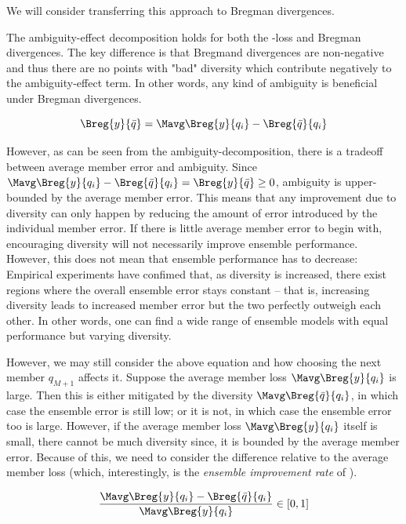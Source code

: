 \documentclass[
    a4paper, %
	fontsize=10pt, %
	twoside=false, %
]{kaobook}
\begin{document}
\begin{titlepage}
We will consider transferring this approach to Bregman divergences.

The ambiguity-effect decomposition holds for both the \zeroone-loss and Bregman divergences. The key difference is that Bregmand divergences are non-negative and thus there are no points with "bad" diversity which contribute negatively to the ambiguity-effect term. In other words, any kind of ambiguity is beneficial under Bregman divergences.

$$
\Breg{y}{\bar{q}} = \Mavg \Breg{y}{q_{i}} - \Breg{\bar{q}}{q_{i}}
$$

However, as can be seen from the ambiguity-decomposition, there is a tradeoff between average member error and ambiguity. Since 
$ \Mavg \Breg{y}{q_{i}} - \Breg{\bar{q}}{q_{i}} = \Breg{y}{\bar{q}} \geq 0$, 
ambiguity is upper-bounded by the average member error. This means that any improvement due to diversity can only happen by reducing the amount of error introduced by the individual member error. If there is little average member error to begin with, encouraging diversity will not necessarily improve ensemble performance. However, this does not mean that ensemble performance has to decrease: Empirical experiments \cite{buschj-etc} have confimed that, as diversity is increased, there exist regions where the overall ensemble error stays constant -- that is, increasing diversity leads to increased member error but the two perfectly outweigh each other. In other words, one can find a wide range of ensemble models with equal performance but varying diversity.


However, we may still consider the above equation and how choosing the next member $q_{M+1}$ affects it. Suppose the average member loss $\Mavg \Breg{y}{q_{i}}$ is large. Then this is either mitigated by the diversity $\Mavg \Breg{\bar{q}}{q_{i}}$, in which case the ensemble error is still low; or it is not, in which case the ensemble error too is large. 
However, if the average member loss $\Mavg\Breg{y}{q_i}$ itself is small, there cannot be much diversity since, it is bounded by the average member error.  Because of this, we need to consider the difference relative to the average member loss (which, interestingly, is the \textit{ensemble improvement rate} of \cite{theisen}).

$$
\frac{
\Mavg \Breg{y}{q_{i}} - \Breg{\bar{q}}{q_{i}}
}{
\Mavg \Breg{y}{q_i}
}
\in [0,1]
$$



\end{titlepage}
\end{document}
